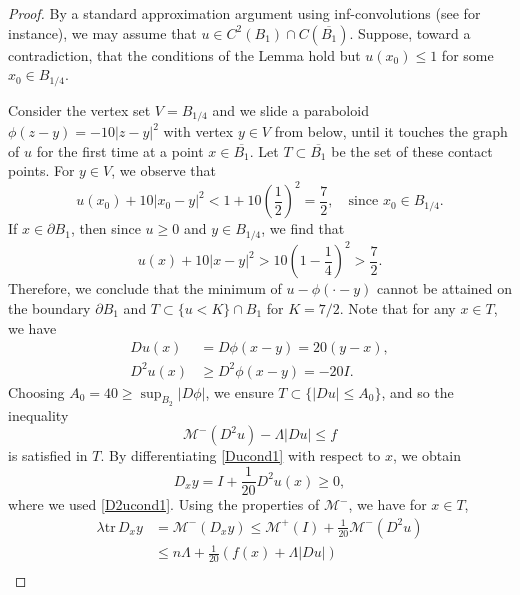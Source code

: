 \documentclass[11pt]{amsart}
\theoremstyle{plain}
\theoremstyle{definition}
\numberwithin{equation}{section}
\begin{document}
\begin{proof}
By a standard approximation argument using inf-convolutions (see \cite[Section~3]{IS16} for instance), we may assume that $u\in C^2(B_1)\cap C(\overline{B_1})$.
Suppose, toward a contradiction, that the conditions of the Lemma hold but $u(x_0) \leq 1$ for some $x_0 \in B_{1/4}$.

Consider the vertex set $V = B_{1/4}$ and we slide a paraboloid $\phi(z-y) = -10|z-y|^2$ with vertex $y \in V$ from below, until it touches the graph of $u$ for the first time at a point $x \in \overline{B_1}$.
Let $T \subset \overline{B_1}$ be the set of these contact points.
For $y \in V$, we observe that
\begin{equation*}
    u(x_0) + 10|x_0-y|^2 < 1+ 10 \left(\frac{1}{2}\right)^2=\frac{7}{2}, \quad \text{since $x_0 \in B_{1/4}$}.
\end{equation*}
If $x \in \partial B_1$, then since $u \geq 0$ and $y \in B_{1/4}$, we find that
\begin{equation*}
    u(x) + 10|x-y|^2 > 10 \left(1-\frac{1}{4}\right)^2>\frac{7}{2}.
\end{equation*}
Therefore, we conclude that the minimum of $u-\phi(\cdot-y)$ cannot be attained on the boundary $\partial B_1$ and $T \subset \{ u<K\} \cap B_1$ for $K=7/2$.
Note that for any $x \in T$, we have
\begin{align}\label{Ducond1}
    Du(x) &= D\phi(x-y) = 20(y-x),\\ \label{D2ucond1}
    D^2u(x) &\geq D^2\phi(x-y) = -20I.
\end{align}
Choosing $A_0=40 \geq \sup_{ B_2}|D\phi|$, we ensure $T \subset \{|Du| \leq A_0\}$, and so the inequality 
\begin{equation*}
    \mathcal{M}^-(D^2u)-\Lambda|Du| \leq f
\end{equation*}
is satisfied in $T$. By differentiating \eqref{Ducond1} with respect to $x$, we obtain
\begin{equation*}
    D_xy = I + \frac{1}{20}D^2u(x) \geq 0,
\end{equation*}
where we used \eqref{D2ucond1}. Using the properties of $\mathcal{M}^-$, we have for $x \in T$,
\begin{equation*}
    \begin{aligned}
        \lambda \mathrm{tr}\,D_xy &= \mathcal{M}^-(D_xy) 
   \leq  \mathcal{M}^+(I) + \frac{1}{20}\mathcal{M}^-(D^2u) \\
   &\leq n\Lambda + \frac{1}{20}(f(x) + \Lambda|Du|) \\

\end{aligned}
\end{equation*}
\end{proof}
\end{document}
